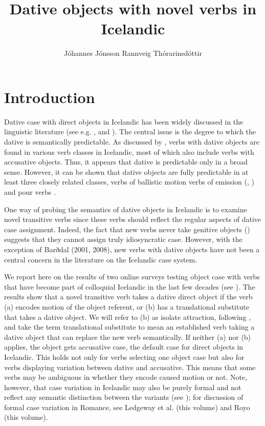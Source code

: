 \documentclass[output=paper,modfonts,nonflat,colorlinks,citecolor=brown]{langsci/langscibook}
\author{Jóhannes Jónsson\affiliation{Unversity of Iceland}\lastand
Rannveig Thórarinsdóttir\affiliation{Unversity of Iceland}}
\title{Dative objects with novel verbs in Icelandic}
\begin{document}
\maketitle 
 

 

\section{Introduction} %

Dative case with direct objects in Icelandic has been widely discussed in the linguistic literature (see e.g. \citealt{YipEtAl1987,Barðdal2001,Barðdal2008,Svenonius2002,Maling2002}, and \citealt{Jónsson2013a}). The central issue is the degree to which the dative is semantically predictable. As discussed by \citet{Maling2002}, verbs with dative objects are found in various verb classes in Icelandic, most of which also include verbs with accusative objects. Thus, it appears that dative is predictable only in a broad sense. However, it can be shown that dative objects are fully predictable in at least three closely related classes, verbs of ballistic motion \citep{Svenonius2002} verbs of emission (\citealt{Maling2002}, \citealt{Jónsson2013a}) and pour verbs \citep{Jónsson2013a}.

One way of probing the semantics of dative objects in Icelandic is to examine novel transitive verbs since these verbs should reflect the regular aspects of dative case assignment. Indeed, the fact that new verbs never take genitive objects (\citealt{JónssonEythórsson2011}) suggests that they cannot assign truly idiosyncratic case. However, with the exception of Barðdal (2001, 2008), new verbs with dative objects have not been a central concern in the literature on the Icelandic case system. 

We report here on the results of two online surveys testing object case with verbs that have become part of colloquial Icelandic in the last few decades (see \citealt{Thórarinsdóttir2015}). The results show that a novel transitive verb takes a dative direct object if the verb (a) encodes motion of the object referent, or (b) has a translational substitute that takes a dative object. We will refer to (b) as isolate attraction, following \citet{Barðdal2001}, and take the term translational substitute to mean an established verb taking a dative object that can replace the new verb semantically. If neither (a) nor (b) applies, the object gets accusative case, the default case for direct objects in Icelandic. This holds not only for verbs selecting one object case but also for verbs displaying variation between dative and accusative. This means that some verbs may be ambiguous in whether they encode caused motion or not. Note, however, that case variation in Icelandic may also be purely formal and not reflect any semantic distinction between the variants (see \citealt{Jónsson2013b}); for discussion of formal case variation in Romance, see Ledgeway et al. (this volume) and Royo (this volume).
\end{document}
